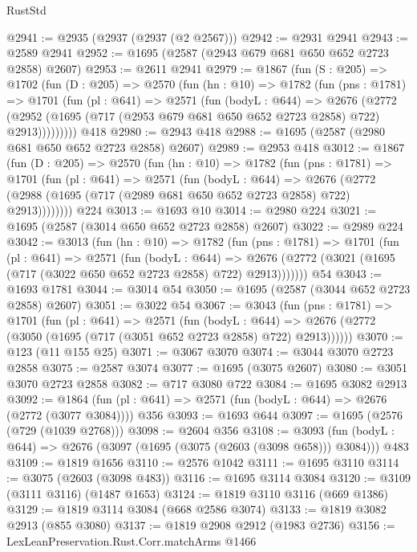 \begin{lexlean}{RustStd}
\begin{coremodule}
@2941 := @2935 (@2937 (@2937 (@2 @2567)))
@2942 := @2931 @2941
@2943 := @2589 @2941
@2952 := @1695 (@2587 (@2943 @679 @681 @650 @652 @2723 @2858) @2607)
@2953 := @2611 @2941
@2979 := @1867
    (fun (S : @205) =>
    @1702
      (fun (D : @205) =>
      @2570
        (fun (hn : @10) =>
        @1782
          (fun (pns : @1781) =>
          @1701
            (fun (pl : @641) =>
            @2571
              (fun (bodyL : @644) =>
              @2676
                (@2772
                  (@2952 (@1695 (@717 (@2953 @679 @681 @650 @652 @2723 @2858) @722) @2913)))))))))
    @418
@2980 := @2943 @418
@2988 := @1695 (@2587 (@2980 @681 @650 @652 @2723 @2858) @2607)
@2989 := @2953 @418
@3012 := @1867
    (fun (D : @205) =>
    @2570
      (fun (hn : @10) =>
      @1782
        (fun (pns : @1781) =>
        @1701
          (fun (pl : @641) =>
          @2571
            (fun (bodyL : @644) =>
            @2676 (@2772 (@2988 (@1695 (@717 (@2989 @681 @650 @652 @2723 @2858) @722) @2913))))))))
    @224
@3013 := @1693 @10
@3014 := @2980 @224
@3021 := @1695 (@2587 (@3014 @650 @652 @2723 @2858) @2607)
@3022 := @2989 @224
@3042 := @3013
    (fun (hn : @10) =>
    @1782
      (fun (pns : @1781) =>
      @1701
        (fun (pl : @641) =>
        @2571
          (fun (bodyL : @644) =>
          @2676 (@2772 (@3021 (@1695 (@717 (@3022 @650 @652 @2723 @2858) @722) @2913)))))))
    @54
@3043 := @1693 @1781
@3044 := @3014 @54
@3050 := @1695 (@2587 (@3044 @652 @2723 @2858) @2607)
@3051 := @3022 @54
@3067 := @3043
    (fun (pns : @1781) =>
    @1701
      (fun (pl : @641) =>
      @2571
        (fun (bodyL : @644) =>
        @2676 (@2772 (@3050 (@1695 (@717 (@3051 @652 @2723 @2858) @722) @2913))))))
@3070 := @123 (@11 @155 @25)
@3071 := @3067 @3070
@3074 := @3044 @3070 @2723 @2858
@3075 := @2587 @3074
@3077 := @1695 (@3075 @2607)
@3080 := @3051 @3070 @2723 @2858
@3082 := @717 @3080 @722
@3084 := @1695 @3082 @2913
@3092 := @1864 (fun (pl : @641) => @2571 (fun (bodyL : @644) => @2676 (@2772 (@3077 @3084)))) @356
@3093 := @1693 @644
@3097 := @1695 (@2576 (@729 (@1039 @2768)))
@3098 := @2604 @356
@3108 := @3093 (fun (bodyL : @644) => @2676 (@3097 (@1695 (@3075 (@2603 (@3098 @658))) @3084))) @483
@3109 := @1819 @1656
@3110 := @2576 @1042
@3111 := @1695 @3110
@3114 := @3075 (@2603 (@3098 @483))
@3116 := @1695 @3114 @3084
@3120 := @3109 (@3111 @3116) (@1487 @1653)
@3124 := @1819 @3110 @3116 (@669 @1386)
@3129 := @1819 @3114 @3084 (@668 @2586 @3074)
@3133 := @1819 @3082 @2913 (@855 @3080)
@3137 := @1819 @2908 @2912 (@1983 @2736)
@3156 := LexLeanPreservation.Rust.Corr.matchArms
    @1466

\end{coremodule}
\end{lexlean}
